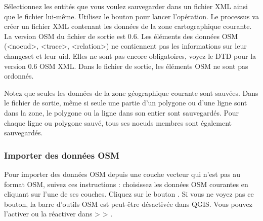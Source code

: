 Sélectionnez les entités que vous voulez sauvegarder dans un fichier XML ainsi que le fichier lui-même. Utilisez le bouton  pour lancer l'opération. Le processus va créer un fichier XML contenant les données de la zone cartographique courante. La version OSM du fichier de sortie est 0.6. Les éléments des données OSM (<noeud>, <trace>, <relation>) ne contiennent pas les informations sur leur changeset et leur uid. Elles ne sont pas encore obligatoires, voyez le DTD pour la version 0.6 OSM XML. Dans le fichier de sortie, les éléments OSM ne sont pas ordonnés.

Notez que seules les données de la zone géographique courante sont sauvées. Dans le fichier de sortie, même si seule une partie d'un polygone ou d'une ligne sont dans la zone, le polygone ou la ligne dans son entier sont sauvegardés. Pour chaque ligne ou polygone sauvé, tous ses noeuds membres sont également sauvegardés.

\subsubsection{Importer des données OSM} 

Pour importer des données OSM depuis une couche vecteur qui n'est pas au format OSM, suivez ces instructions : choisissez les données OSM courantes en cliquant sur l'une de ses couches. Cliquez sur le bouton . Si vous ne voyez pas ce bouton, la barre d'outils OSM est peut-être désactivée dans QGIS. Vous pouvez l'activer ou la réactiver dans  >  > .

